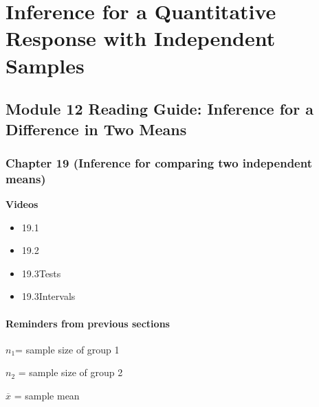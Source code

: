 \documentclass[
]{report}
\providecommand{\tightlist}{%
  \setlength{\itemsep}{0pt}\setlength{\parskip}{0pt}}
\begin{document}
\vspace{2.6in}

\newpage

\hypertarget{inference-for-a-quantitative-response-with-independent-samples}{%
\chapter{Inference for a Quantitative Response with Independent Samples}\label{inference-for-a-quantitative-response-with-independent-samples}}

\hypertarget{module-12-reading-guide-inference-for-a-difference-in-two-means}{%
\section{Module 12 Reading Guide: Inference for a Difference in Two Means}\label{module-12-reading-guide-inference-for-a-difference-in-two-means}}

\hypertarget{chapter-19-inference-for-comparing-two-independent-means}{%
\subsection*{Chapter 19 (Inference for comparing two independent means)}\label{chapter-19-inference-for-comparing-two-independent-means}}

\textbf{Videos}

\begin{itemize}
\tightlist
\item
  19.1
\item
  19.2
\item
  19.3Tests
\item
  19.3Intervals
\end{itemize}


\hypertarget{reminders-from-previous-sections-2}{%
\subsubsection*{Reminders from previous sections}\label{reminders-from-previous-sections-2}}

\(n_1\)= sample size of group 1

\(n_2\) = sample size of group 2

\(\overline{x}\) = sample mean
\end{document}
